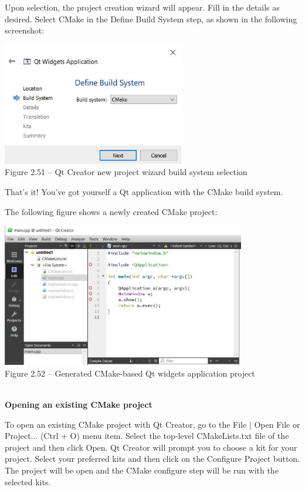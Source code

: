 Upon selection, the project creation wizard will appear. Fill in the details as desired. Select CMake in the Define Build System step, as shown in the following screenshot:

\begin{center}
\includegraphics[width=0.6\textwidth]{content/1/chapter2/images/51.jpg}\\
Figure 2.51 – Qt Creator new project wizard build system selection
\end{center}

That's it! You've got yourself a Qt application with the CMake build system.

The following figure shows a newly created CMake project:

\begin{center}
\includegraphics[width=0.8\textwidth]{content/1/chapter2/images/52.jpg}\\
Figure 2.52 – Generated CMake-based Qt widgets application project
\end{center}

\hspace*{\fill} \\ %
\noindent
\textbf{Opening an existing CMake project}

To open an existing CMake project with Qt Creator, go to the File | Open File or Project... (Ctrl + O) menu item. Select the top-level CMakeLists.txt file of the project and then click Open. Qt Creator will prompt you to choose a kit for your project. Select your preferred kits and then click on the Configure Project button. The project will be open and the CMake configure step will be run with the selected kits.

